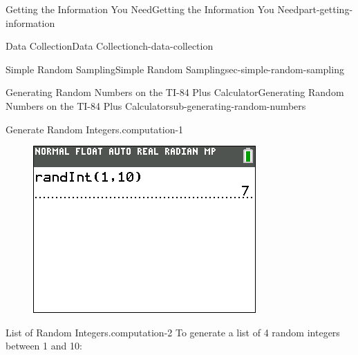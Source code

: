 \documentclass[oneside,10pt,]{book}
\newcommand{\mono}[1]{\texttt{#1}}
\numberwithin{equation}{section}
\newenvironment{codedisplay}
{\VerbatimEnvironment\begin{center}\begin{lrbox}{\codedisplaybox}\begin{BVerbatim}}
{\end{BVerbatim}\end{lrbox}\usebox{\codedisplaybox}\end{center}}
\begin{document}
\begin{partptx}{Getting the Information You Need}{}{Getting the Information You Need}{}{}{part-getting-information}
\begin{chapterptx}{Data Collection}{}{Data Collection}{}{}{ch-data-collection}
\begin{sectionptx}{Simple Random Sampling}{}{Simple Random Sampling}{}{}{sec-simple-random-sampling}
\begin{subsectionptx}{Generating Random Numbers on the TI-84 Plus Calculator}{}{Generating Random Numbers on the TI-84 Plus Calculator}{}{}{sub-generating-random-numbers}
\begin{computation}{Generate Random Integers.}{computation-1}
%
\begin{figure}\centering\includegraphics[width=0.4\linewidth]{images/randInt-single.png}
\end{figure}\end{computation}
\begin{computation}{List of Random Integers.}{computation-2}%
\hypertarget{p-11}{}%
To generate a list of 4 random integers between 1 and 10:\leavevmode%
\end{computation}
\end{subsectionptx}
\end{sectionptx}
\end{chapterptx}
\end{partptx}
\end{document}
